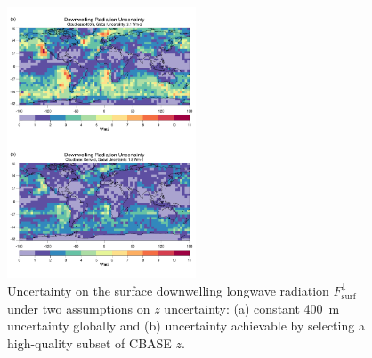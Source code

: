 \documentclass[essd,manuscript]{copernicus}\usepackage[]{graphicx}\usepackage[]{color}
\newcommand\CBH{\ensuremath{z}}
\newcommand\DLR{\ensuremath{F_\text{surf}^\downarrow}}
\begin{document}
\begin{figure}
  {\centering \includegraphics[width=0.5\textwidth]{figure/DLW_uncert.pdf}
    
  }
  \caption{Uncertainty on the surface downwelling longwave radiation \DLR{}
    under two assumptions on \CBH{} uncertainty: (a) constant 400~\unit{m}
    uncertainty globally and (b) uncertainty achievable by selecting a 
    high-quality subset of CBASE \CBH.}
  \label{fig:dlr}
\end{figure}

\end{document}
